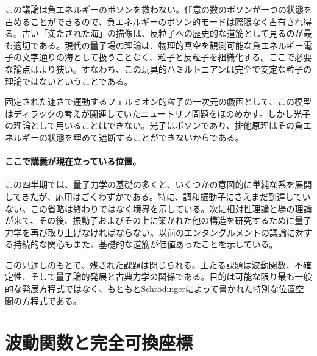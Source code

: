 この議論は負エネルギーのボソンを救わない。任意の数のボソンが一つの状態を占めることができるので、負エネルギーのボソン的モードは際限なく占有され得る。古い「満たされた海」の描像は、反粒子への歴史的な道筋として見るのが最も適切である。現代の量子場の理論は、物理的真空を観測可能な負エネルギー電子の文字通りの海として扱うことなく、粒子と反粒子を組織化する。ここで必要な論点はより狭い。すなわち、この玩具的ハミルトニアンは完全で安定な粒子の理論ではないということである。

固定された速さで運動するフェルミオン的粒子の一次元の戯画として、この模型はディラックの考えが関連していたニュートリノ問題をほのめかす。しかし光子の理論として用いることはできない。光子はボソンであり、排他原理はその負エネルギーの状態を埋めて遮断することができないからである。

\begin{classroomqa}
\end{classroomqa}

\paragraph{ここで講義が現在立っている位置。}
この四半期では、量子力学の基礎の多くと、いくつかの意図的に単純な系を展開してきたが、応用はごくわずかである。特に、調和振動子にさえまだ到達していない。この省略は終わりではなく境界を示している。次に相対性理論と場の理論が来て、その後、振動子およびその上に築かれた他の構造を研究するために量子力学を再び取り上げなければならない。以前のエンタングルメントの議論に対する持続的な関心もまた、基礎的な道筋が価値あったことを示している。

この見通しのもとで、残された課題は閉じられる。主たる課題は波動関数、不確定性、そして量子論的発展と古典力学の関係である。目的は可能な限り最も一般的な発展方程式ではなく、もともとSchr\"odingerによって書かれた特別な位置空間の方程式である。

\section{波動関数と完全可換座標}

